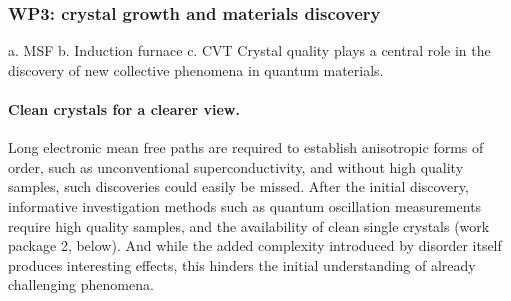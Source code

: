 \subsubsection*{WP3: crystal growth and materials discovery}
\noindent
a. MSF 
b. Induction furnace
c. CVT
Crystal quality plays a central role in the discovery of new collective phenomena in quantum materials. %


\paragraph{Clean crystals for a clearer view.} Long electronic mean free paths are required to establish anisotropic forms of order, such as unconventional superconductivity, and without high quality samples, such discoveries could easily be missed. After the initial discovery, informative investigation methods such as quantum oscillation measurements require high quality samples, and the availability of clean single crystals  (work package 2, below). And while the added complexity introduced by disorder itself produces interesting effects, this hinders the initial understanding of already challenging phenomena. %


